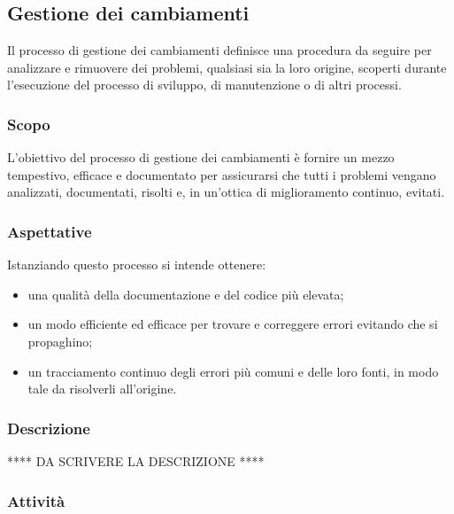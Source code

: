 \subsection{Gestione dei cambiamenti}

	Il processo di gestione dei cambiamenti definisce una procedura da seguire per analizzare e rimuovere dei problemi, qualsiasi sia la loro origine, scoperti durante l'esecuzione del processo di sviluppo, di manutenzione o di altri processi.

	\subsubsection{Scopo}
		L'obiettivo del processo di gestione dei cambiamenti è fornire un mezzo tempestivo, efficace e documentato per assicurarsi che tutti i problemi vengano analizzati, documentati, risolti e, in un'ottica di miglioramento continuo, evitati.

	\subsubsection{Aspettative}
		Istanziando questo processo si intende ottenere:
		\begin{itemize}
		 	\item una qualità della documentazione e del codice più elevata;
		 	\item un modo efficiente ed efficace per trovare e correggere errori evitando che si propaghino;
		 	\item un tracciamento continuo degli errori più comuni e delle loro fonti, in modo tale da risolverli all'origine.
		 \end{itemize}
	\subsubsection{Descrizione}
		**** DA SCRIVERE LA DESCRIZIONE ****

	\subsubsection{Attività}
